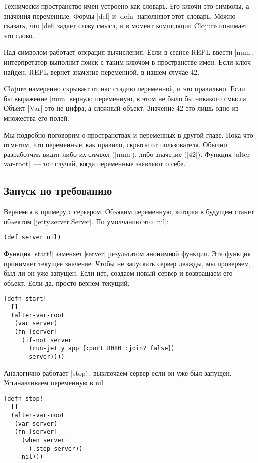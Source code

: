 Технически пространство имен устроено как словарь. Его ключи это символы, а
значения переменные. Формы \spverb|def| и \spverb|defn| наполняют этот словарь. Можно сказать,
что \spverb|def| задает слову смысл, и в момент компиляции Clojure понимает это слово.

Над символом работает операция вычисления. Если в сеансе REPL ввести \spverb|num|,
интерпретатор выполнит поиск с таким ключом в пространстве имен. Если ключ
найден, REPL вернет значение переменной, в нашем случае 42.

Clojure намеренно скрывает от нас стадию переменной, и это правильно. Если бы
выражение \spverb|num| вернуло переменную, в этом не было бы никакого смысла. Объект
\spverb|Var| это не цифра, а сложный объект. Значение 42 это лишь одно из множества его
полей.

Мы подробно поговорим о пространствах и переменных в другой главе. Пока что
отметим, что переменные, как правило, скрыты от пользователя. Обычно разработчик
видит либо их символ (\spverb|num|), либо значение (\spverb|42|). Функция \spverb|alter-var-root|~---
тот случай, когда переменные заявляют о себе.

\subsection{Запуск по требованию}

Вернемся к примеру с сервером. Объявим переменную, которая в будущем станет
объектом \spverb|jetty.server.Server|. По умолчанию это \spverb|nil|:

\begin{verbatim}
(def server nil)
\end{verbatim}

Функция \spverb|start!| заменяет \spverb|server| результатом анонимной функции. Эта функция
принимает текущее значение. Чтобы не запускать сервер дважды, мы проверяем, был
ли он уже запущен. Если нет, создаем новый сервер и возвращаем его объект. Если
да, просто вернем текущий.

\begin{verbatim}
(defn start!
  []
  (alter-var-root
   (var server)
   (fn [server]
     (if-not server
       (run-jetty app {:port 8080 :join? false})
       server))))
\end{verbatim}

Аналогично работает \spverb|stop!|: выключаем сервер если он уже был
запущен. Устанавливаем переменную в nil.

\begin{verbatim}
(defn stop!
  []
  (alter-var-root
   (var server)
   (fn [server]
     (when server
       (.stop server))
     nil)))
\end{verbatim}

